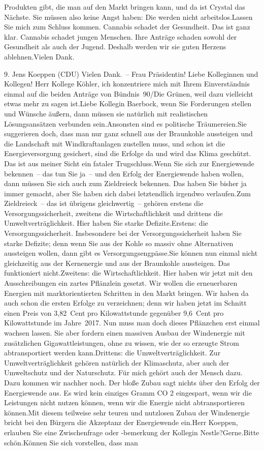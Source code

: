 \documentclass{article}
\begin{document}
Produkten gibt, die man auf den Markt bringen kann, und da ist Crystal das Nächste. Sie müssen also keine Angst haben: Die werden nicht arbeitslos.Lassen Sie mich zum Schluss kommen. Cannabis schadet der Gesundheit. Das ist ganz klar. Cannabis schadet jungen Menschen. Ihre Anträge schaden sowohl der Gesundheit als auch der Jugend. Deshalb werden wir sie guten Herzens ablehnen.Vielen Dank.




	9. Jens Koeppen (CDU) Vielen Dank. – Frau Präsidentin! Liebe Kolleginnen und Kollegen! Herr Kollege Köhler, ich konzentriere mich mit Ihrem Einverständnis einmal auf die beiden Anträge von Bündnis 90/Die Grünen, weil dazu vielleicht etwas mehr zu sagen ist.Liebe Kollegin Baerbock, wenn Sie Forderungen stellen und Wünsche äußern, dann müssen sie natürlich mit realistischen Lösungsansätzen verbunden sein.Ansonsten sind es politische Träumereien.Sie suggerieren doch, dass man nur ganz schnell aus der Braunkohle aussteigen und die Landschaft mit Windkraftanlagen zustellen muss, und schon ist die Energieversorgung gesichert, sind die Erfolge da und wird das Klima geschützt. Das ist aus meiner Sicht ein fataler Trugschluss.Wenn Sie sich zur Energiewende bekennen – das tun Sie ja – und den Erfolg der Energiewende haben wollen, dann müssen Sie sich auch zum Zieldreieck bekennen. Das haben Sie bisher ja immer gemacht, aber Sie haben sich dabei letztendlich irgendwo verlaufen.Zum Zieldreieck – das ist übrigens gleichwertig – gehören erstens die Versorgungssicherheit, zweitens die Wirtschaftlichkeit und drittens die Umweltverträglichkeit. Hier haben Sie starke Defizite.Erstens: die Versorgungssicherheit. Insbesondere bei der Versorgungssicherheit haben Sie starke Defizite; denn wenn Sie aus der Kohle so massiv ohne Alternativen aussteigen wollen, dann gibt es Versorgungsengpässe.Sie können nun einmal nicht gleichzeitig aus der Kernenergie und aus der Braunkohle aussteigen. Das funktioniert nicht.Zweitens: die Wirtschaftlichkeit. Hier haben wir jetzt mit den Ausschreibungen ein zartes Pflänzlein gesetzt. Wir wollen die erneuerbaren Energien mit marktorientierten Schritten in den Markt bringen. Wir haben da auch schon die ersten Erfolge zu verzeichnen; denn wir haben jetzt im Schnitt einen Preis von 3,82 Cent pro Kilowattstunde gegenüber 9,6 Cent pro Kilowattstunde im Jahre 2017. Nun muss man doch dieses Pflänzchen erst einmal wachsen lassen. Sie aber fordern einen massiven Ausbau der Windenergie mit zusätzlichen Gigawattleistungen, ohne zu wissen, wie der so erzeugte Strom abtransportiert werden kann.Drittens: die Umweltverträglichkeit. Zur Umweltverträglichkeit gehören natürlich der Klimaschutz, aber auch der Umweltschutz und der Naturschutz. Für mich gehört auch der Mensch dazu. Dazu kommen wir nachher noch. Der bloße Zubau sagt nichts über den Erfolg der Energiewende aus. Es wird kein einziges Gramm CO 2 eingespart, wenn wir die Leistungen nicht nutzen können, wenn wir die Energie nicht abtransportieren können.Mit diesem teilweise sehr teuren und nutzlosen Zubau der Windenergie bricht bei den Bürgern die Akzeptanz der Energiewende ein.Herr Koeppen, erlauben Sie eine Zwischenfrage oder -bemerkung der Kollegin Nestle?Gerne.Bitte schön.Können Sie sich vorstellen, dass man 
\end{document}
